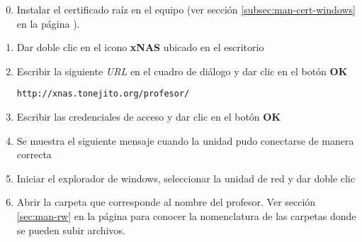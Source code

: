 {
\linespread{0.1}
\begin{enumerate}
\setcounter{enumi}{-1} %

  \item Instalar el certificado ra\'{i}z en el equipo (ver secci\'{o}n \ref{subsec:man-cert-windows} en la p\'{a}gina \pageref{subsec:man-cert-windows}).

  \item Dar doble clic en el icono \textbf{xNAS} ubicado en el escritorio


  \item Escribir la siguiente \textit{URL} en el cuadro de di\'{a}logo y dar clic en el bot\'{o}n \textbf{OK}

    \texttt{http://xnas.tonejito.org/profesor/}

\newpage
  \item Escribir las credenciales de acceso y dar clic en el bot\'{o}n \textbf{OK}


  \item Se muestra el siguiente mensaje cuando la unidad pudo conectarse de manera correcta


  \item Iniciar el explorador de windows, seleccionar la unidad de red y dar doble clic


  \item Abrir la carpeta que corresponde al nombre del profesor. Ver secci\'{o}n \ref{sec:man-rw} en la p\'{a}gina \pageref{sec:man-rw} para conocer la nomenclatura de las carpetas donde se pueden subir archivos.


%

\end{enumerate}
}


